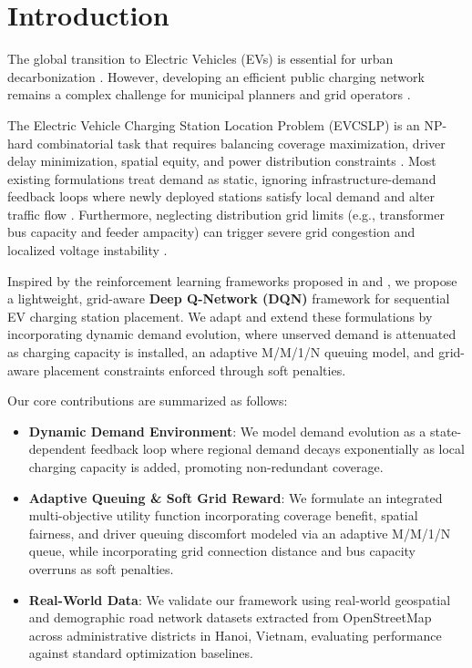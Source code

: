 \documentclass[10pt, conference, a4paper, compsocconf]{IEEEtran}
\begin{document}
\IEEEpeerreviewmaketitle

\section{Introduction}

The global transition to Electric Vehicles (EVs) is essential for urban decarbonization \cite{veisi2021optimal, vu2025vietnam}. However, developing an efficient public charging network remains a complex challenge for municipal planners and grid operators \cite{gomez2020heuristic, rahman2024hybrid}.

The Electric Vehicle Charging Station Location Problem (EVCSLP) is an NP-hard combinatorial task that requires balancing coverage maximization, driver delay minimization, spatial equity, and power distribution constraints \cite{zhang2022location, ali2022improved}. Most existing formulations treat demand as static, ignoring infrastructure-demand feedback loops where newly deployed stations satisfy local demand and alter traffic flow \cite{von2022reinforcement, hassan2025optimizing}. Furthermore, neglecting distribution grid limits (e.g., transformer bus capacity and feeder ampacity) can trigger severe grid congestion and localized voltage instability \cite{veisi2021optimal, erbas2022optimal, zhang2023commercial}.

Inspired by the reinforcement learning frameworks proposed in \cite{von2022reinforcement} and \cite{liu2023optimal}, we propose a lightweight, grid-aware \textbf{Deep Q-Network (DQN)} framework for sequential EV charging station placement. We adapt and extend these formulations by incorporating dynamic demand evolution, where unserved demand is attenuated as charging capacity is installed, an adaptive M/M/1/N queuing model, and grid-aware placement constraints enforced through soft penalties.

Our core contributions are summarized as follows:
\begin{itemize}
    \item \textbf{Dynamic Demand Environment}: We model demand evolution as a state-dependent feedback loop where regional demand decays exponentially as local charging capacity is added, promoting non-redundant coverage.
    \item \textbf{Adaptive Queuing \& Soft Grid Reward}: We formulate an integrated multi-objective utility function incorporating coverage benefit, spatial fairness, and driver queuing discomfort modeled via an adaptive M/M/1/N queue, while incorporating grid connection distance and bus capacity overruns as soft penalties.
    \item \textbf{Real-World Data}: We validate our framework using real-world geospatial and demographic road network datasets extracted from OpenStreetMap across administrative districts in Hanoi, Vietnam, evaluating performance against standard optimization baselines.
\end{itemize}
\end{document}
